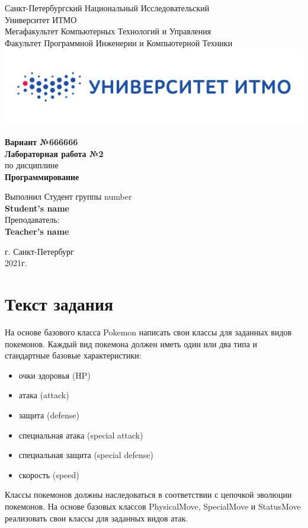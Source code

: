 \documentclass[12pt,onecolumn]{article}
\begin{document}
\setcounter{tocdepth}{4}
\begin{center}
    Санкт-Петербургский Национальный Исследовательский\\ 
    Университет ИТМО\\
    Мегафакультет Компьютерных Технологий и Управления\\
    Факультет Программной Инженерии и Компьютерной Техники \\
    \includegraphics[scale=0.3]{itm.jpg} %
\end{center}
\vspace{1cm}


\begin{center}
    \large \textbf{Вариант №666666}\\
    \textbf{Лабораторная работа №2}\\
    по дисциплине\\
    \textbf{Программирование}
\end{center}

\vspace{2cm}

\begin{flushright}
  Выполнил Студент  группы number\\
  \textbf{Student's name}\\
  Преподаватель: \\
  \textbf{Teacher's name}\\
\end{flushright}

\vspace{10cm}
\begin{center}
    г. Санкт-Петербург\\
    2021г.
\end{center}
\newpage
\tableofcontents
\newpage
\section{Текст задания}
На основе базового класса Pokemon написать свои классы для заданных видов покемонов. Каждый вид покемона должен иметь один или два типа и стандартные базовые характеристики:
\begin{itemize}
    \item очки здоровья (HP)
    \item атака (attack)
    \item защита (defense)
    \item специальная атака (special attack)
    \item специальная защита (special defense)
    \item скорость (speed)
\end{itemize}
Классы покемонов должны наследоваться в соответствии с цепочкой эволюции покемонов. На основе базовых классов PhysicalMove, SpecialMove и StatusMove реализовать свои классы для заданных видов атак.
\end{document}
